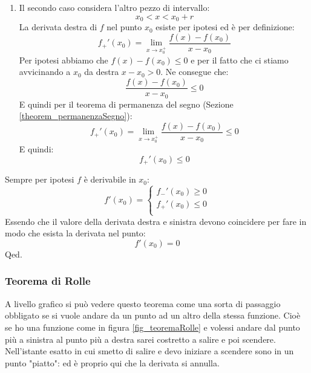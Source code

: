 {\begin{enumerate}
		\item Il secondo caso considera l'altro pezzo di intervallo:
			\begin{equation*}
				x_0< x < x_0 + r
			\end{equation*}
			La derivata destra di $f$ nel punto $x_0$ esiste per ipotesi ed è per definizione:
			\begin{equation*}
				f_+'(x_0) = \lim_{x \to x_0^+}  \dfrac{f(x) - f(x_0)}{x-x_0}
			\end{equation*}
			Per ipotesi abbiamo che $f(x) - f(x_0) \leq 0$ e per il fatto che ci stiamo avvicinando a $x_0$ da destra $x - x_0 > 0$. Ne consegue che:
			\begin{equation*}
				\dfrac{f(x) - f(x_0)}{x-x_0} \leq 0
			\end{equation*}
			E quindi per il teorema di permanenza del segno (Sezione \ref{theorem_permanenzaSegno}):
			\begin{equation*}
				f_+'(x_0) = \lim_{x \to x_0^+}  \dfrac{f(x) - f(x_0)}{x-x_0} \leq 0
			\end{equation*}
			E quindi:
			\begin{equation*}
				f_+'(x_0) \leq 0
			\end{equation*}
	\end{enumerate}
	Sempre per ipotesi $f$ è derivabile in $x_0$:
	\begin{equation*}
		f'(x_0) =
		\begin{cases*}
			f_-' (x_0) \geq 0\\[10pt]
			f_+' (x_0) \leq 0\\
		\end{cases*}
	\end{equation*}
	Essendo che il valore della derivata destra e sinistra devono coincidere per fare in modo che esista la derivata nel punto:
	\begin{equation*}
		f'(x_0) = 0
	\end{equation*}
	\hfill Qed.
}

\subsubsection{Teorema di Rolle} \label{sec_teoremaRolle}

\thm {
Data una funzione $f:[a,b] \to \mathbb{R}$ con le seguenti proprietà:
\begin{enumerate}
    \item $f$ è continua su $[a,b]$
    \item $f$ è derivabile su $]a,b[$
    \item $f(a) = f(b)$
\end{enumerate}
Allora:
\begin{equation*}
    \exists \,c \in ]a,b[ \;: f'(c) = 0
\end{equation*}
}
A livello grafico si può vedere questo teorema come una sorta di passaggio obbligato se si vuole andare da un punto ad un altro della stessa funzione. Cioè se ho una funzione come in figura \ref{fig_teoremaRolle} e volessi andare dal punto più a sinistra al punto più a destra sarei costretto a salire e poi scendere. Nell'istante esatto in cui smetto di salire e devo iniziare a scendere sono in un punto "piatto": ed è proprio qui che la derivata si annulla.

